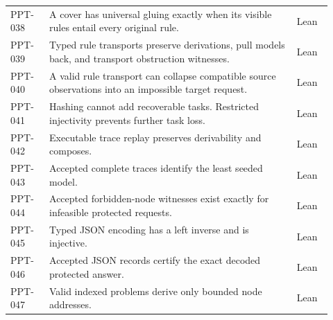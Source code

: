 \documentclass[11pt,oneside,openany]{book}
\numberwithin{equation}{section}
\begin{document}
\begin{longtable}{@{}L{0.115\linewidth}L{0.70\linewidth}L{0.105\linewidth}@{}}
PPT-038 & A cover has universal gluing exactly when its visible rules entail every original rule. & {\sffamily\small\color{KomorebiTeal}Lean}\\[0pt]
PPT-039 & Typed rule transports preserve derivations, pull models back, and transport obstruction witnesses. & {\sffamily\small\color{KomorebiTeal}Lean}\\[0pt]
PPT-040 & A valid rule transport can collapse compatible source observations into an impossible target request. & {\sffamily\small\color{KomorebiTeal}Lean}\\[0pt]
PPT-041 & Hashing cannot add recoverable tasks. Restricted injectivity prevents further task loss. & {\sffamily\small\color{KomorebiTeal}Lean}\\[0pt]
PPT-042 & Executable trace replay preserves derivability and composes. & {\sffamily\small\color{KomorebiTeal}Lean}\\[0pt]
PPT-043 & Accepted complete traces identify the least seeded model. & {\sffamily\small\color{KomorebiTeal}Lean}\\[0pt]
PPT-044 & Accepted forbidden-node witnesses exist exactly for infeasible protected requests. & {\sffamily\small\color{KomorebiTeal}Lean}\\[0pt]
PPT-045 & Typed JSON encoding has a left inverse and is injective. & {\sffamily\small\color{KomorebiTeal}Lean}\\[0pt]
PPT-046 & Accepted JSON records certify the exact decoded protected answer. & {\sffamily\small\color{KomorebiTeal}Lean}\\[0pt]
PPT-047 & Valid indexed problems derive only bounded node addresses. & {\sffamily\small\color{KomorebiTeal}Lean}\\[0pt]
\end{longtable}
\renewcommand{\arraystretch}{1.0}
\endgroup
\end{document}

